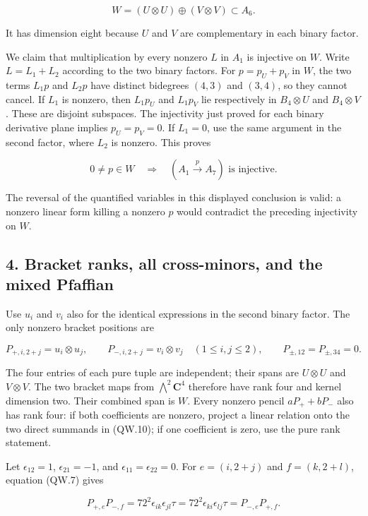 \[
 W=(U\otimes U)\oplus(V\otimes V)\subset A_6.
\tag{QW.10}
\]

It has dimension eight because \(U\) and \(V\) are complementary in each
binary factor.

We claim that multiplication by every nonzero \(L\) in \(A_1\) is injective
on \(W\). Write \(L=L_1+L_2\) according to the two binary factors. For
\(p=p_U+p_V\) in \(W\), the two terms \(L_1p\) and \(L_2p\) have distinct bidegrees
\((4,3)\) and \((3,4)\), so they cannot cancel. If \(L_1\) is nonzero, then
\(L_1p_U\) and \(L_1p_V\) lie respectively in \(B_4\otimes U\) and \(B_4\otimes V\).
These are disjoint subspaces. The injectivity just proved for each
binary derivative plane implies \(p_U=p_V=0\). If \(L_1=0\), use the same
argument in the second factor, where \(L_2\) is nonzero. This proves

\[
 0\ne p\in W\quad\Longrightarrow\quad
       (A_1\xrightarrow{\,p\,}A_7)\text{ is injective}.
\tag{QW.11}
\]

The reversal of the quantified variables in this displayed conclusion
is valid: a nonzero linear form killing a nonzero \(p\) would contradict
the preceding injectivity on \(W\).

\subsection{4. Bracket ranks, all cross-minors, and the mixed Pfaffian}\label{SF-E848W:s4}

Use \(u_i\) and \(v_i\) also for the identical expressions in the second
binary factor. The only nonzero bracket positions are

\[
 P_{+,i,2+j}=u_i\otimes u_j,\qquad
 P_{-,i,2+j}=v_i\otimes v_j\quad(1\le i,j\le2),
 \qquad P_{\pm,12}=P_{\pm,34}=0.
\tag{QW.12}
\]

The four entries of each pure tuple are independent; their spans are
\(U\otimes U\) and \(V\otimes V\). The two bracket maps from \(\bigwedge^2\mathbf C^4\)
therefore have rank four and kernel dimension two. Their combined
span is \(W\). Every nonzero pencil \(aP_++bP_-\) also has rank four: if
both coefficients are nonzero, project a linear relation onto the
two direct summands in (QW.10); if one coefficient is zero, use the
pure rank statement.

Let \(\epsilon_{12}=1\), \(\epsilon_{21}=-1\), and \(\epsilon_{11}=\epsilon_{22}=0\).
For \(e=(i,2+j)\) and \(f=(k,2+l)\), equation (QW.7) gives

\[
 P_{+,e}P_{-,f}=72^2\epsilon_{ik}\epsilon_{jl}\tau
            =72^2\epsilon_{ki}\epsilon_{lj}\tau
            =P_{-,e}P_{+,f}.
\tag{QW.13}
\]

